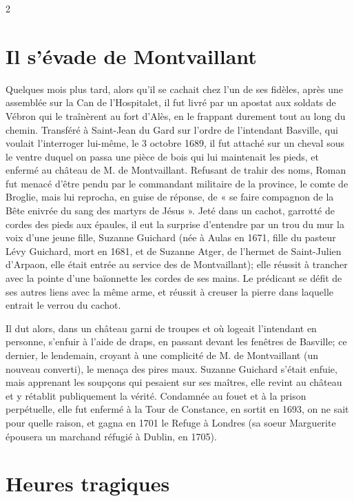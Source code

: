 {\begin{multicols}{2}
\section*{Il s’évade de Montvaillant}

Quelques mois plus tard, alors qu’il se cachait chez l’un de ses fidèles, après une assemblée sur la Can de l’Hospitalet, il fut livré par un apostat aux soldats de Vébron qui le traînèrent au fort d’Alès, en le frappant durement tout au long du chemin. Transféré à Saint-Jean du Gard sur l’ordre de l’intendant Basville, qui voulait l’interroger lui-même, le 3 octobre 1689, il fut attaché sur un cheval sous le ventre duquel on passa une pièce de bois qui lui maintenait les pieds, et enfermé au château de M. de Montvaillant. Refusant de trahir des noms, Roman fut menacé d’être pendu par le commandant militaire de la province, le comte de Broglie, mais lui reprocha, en guise de réponse, de « se faire compagnon de la Bête enivrée du sang des martyrs de Jésus ». Jeté dans un cachot, garrotté de cordes des pieds aux épaules, il eut la surprise d’entendre par un trou du mur la voix d’une jeune fille, Suzanne Guichard (née à Aulas en 1671, fille du pasteur Lévy Guichard, mort en 1681, et de Suzanne Atger, de l’hermet de Saint-Julien d’Arpaon, elle était entrée au service des de Montvaillant); elle réussit à trancher avec la pointe d’une baïonnette les cordes de ses mains. Le prédicant se défit de ses autres liens avec la même arme, et réussit à creuser la pierre dans laquelle entrait le verrou du cachot.

Il dut alors, dans un château garni de troupes et où logeait l’intendant en personne, s’enfuir à l’aide de draps, en passant devant les fenêtres de Basville; ce dernier, le lendemain, croyant à une complicité de M. de Montvaillant (un nouveau converti), le menaça des pires maux. Suzanne Guichard s’était enfuie, mais apprenant les soupçons qui pesaient sur ses maîtres, elle revint au château et y rétablit publiquement la vérité. Condamnée au fouet et à la prison perpétuelle, elle fut enfermé à la Tour de Constance, en sortit en 1693, on ne sait pour quelle raison, et gagna en 1701 le Refuge à Londres (sa soeur Marguerite épousera un marchand réfugié à Dublin, en 1705).

\section*{Heures tragiques}


\end{multicols}}
